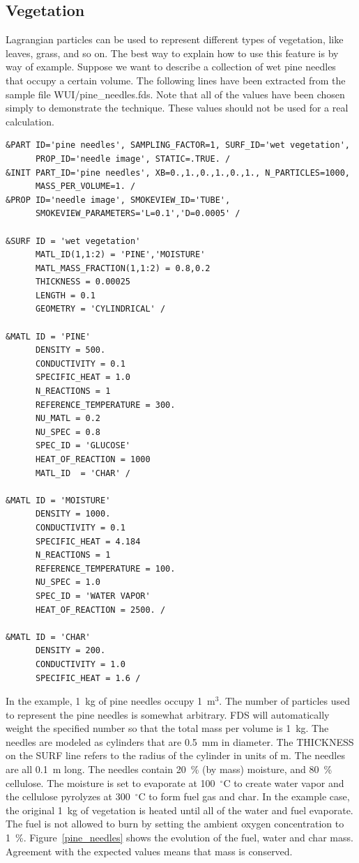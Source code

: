 \documentclass[11pt]{book}
\begin{document}
\subsection{Vegetation}
\label{info:vegetation}

Lagrangian particles can be used to represent different types of vegetation, like leaves, grass, and so on. The best way to explain how to use this feature is by way of example. Suppose we want to describe a collection of wet pine needles that occupy a certain volume. The following lines have been extracted from the sample file {\ct WUI/pine\_needles.fds}. Note that all of the values have been chosen simply to demonstrate the technique. These values should not be used for a real calculation.

\begin{lstlisting}
&PART ID='pine needles', SAMPLING_FACTOR=1, SURF_ID='wet vegetation',
      PROP_ID='needle image', STATIC=.TRUE. /
&INIT PART_ID='pine needles', XB=0.,1.,0.,1.,0.,1., N_PARTICLES=1000,
      MASS_PER_VOLUME=1. /
&PROP ID='needle image', SMOKEVIEW_ID='TUBE',
      SMOKEVIEW_PARAMETERS='L=0.1','D=0.0005' /

&SURF ID = 'wet vegetation'
      MATL_ID(1,1:2) = 'PINE','MOISTURE'
      MATL_MASS_FRACTION(1,1:2) = 0.8,0.2
      THICKNESS = 0.00025
      LENGTH = 0.1
      GEOMETRY = 'CYLINDRICAL' /

&MATL ID = 'PINE'
      DENSITY = 500.
      CONDUCTIVITY = 0.1
      SPECIFIC_HEAT = 1.0
      N_REACTIONS = 1
      REFERENCE_TEMPERATURE = 300.
      NU_MATL = 0.2
      NU_SPEC = 0.8
      SPEC_ID = 'GLUCOSE'
      HEAT_OF_REACTION = 1000
      MATL_ID  = 'CHAR' /

&MATL ID = 'MOISTURE'
      DENSITY = 1000.
      CONDUCTIVITY = 0.1
      SPECIFIC_HEAT = 4.184
      N_REACTIONS = 1
      REFERENCE_TEMPERATURE = 100.
      NU_SPEC = 1.0
      SPEC_ID = 'WATER VAPOR'
      HEAT_OF_REACTION = 2500. /

&MATL ID = 'CHAR'
      DENSITY = 200.
      CONDUCTIVITY = 1.0
      SPECIFIC_HEAT = 1.6 /
\end{lstlisting}
In the example, 1~kg of pine needles occupy 1~m$^3$. The number of particles used to represent the pine needles is somewhat arbitrary. FDS will automatically weight the specified number so that the total mass per volume is 1~kg. The needles are modeled as cylinders that are 0.5~mm in diameter. The {\ct THICKNESS} on the {\ct SURF} line refers to the radius of the cylinder in units of m. The needles are all 0.1~m long. The needles contain 20~\% (by mass) moisture, and 80~\% cellulose. The moisture is set to evaporate at 100~$^\circ$C to create water vapor and the cellulose pyrolyzes at 300~$^\circ$C to form fuel gas and char. In the example case, the original 1~kg of vegetation is heated until all of the water and fuel evaporate. The fuel is not allowed to burn by setting the ambient oxygen concentration to 1~\%. Figure~\ref{pine_needles} shows the evolution of the fuel, water and char mass. Agreement with the expected values means that mass is conserved.
\end{document}
